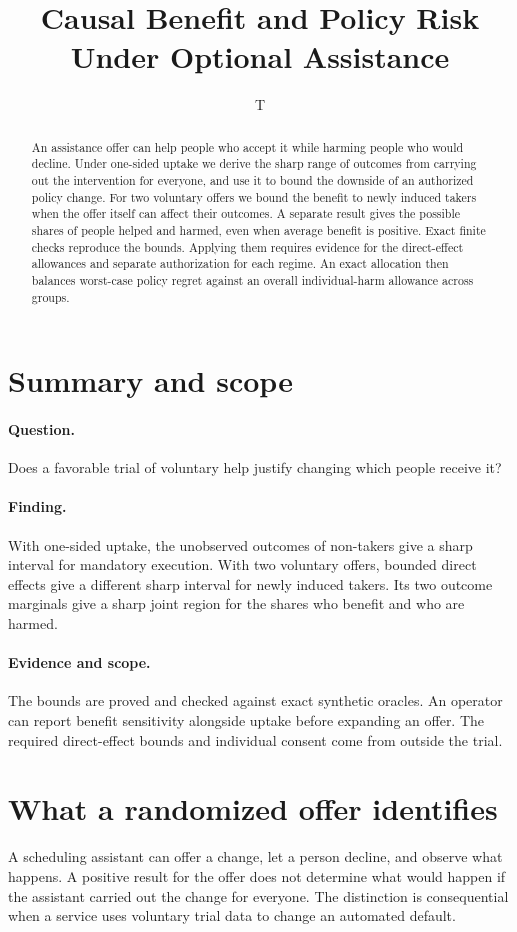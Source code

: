 \documentclass[11pt]{article}
\title{Causal Benefit and Policy Risk Under Optional Assistance}
\author{T}
\date{}
\begin{document}
\maketitle
\begin{abstract}
An assistance offer can help people who accept it while harming
people who would decline. Under one-sided uptake we derive the
sharp range of outcomes from carrying out the intervention for
everyone, and use it to bound the downside of an authorized policy
change. For two voluntary offers we bound the benefit to newly
induced takers when the offer itself can affect their outcomes.
A separate result gives the possible shares of people helped and
harmed, even when average benefit is positive. Exact finite checks
reproduce the bounds. Applying them requires evidence for the
direct-effect allowances and separate authorization for each regime.
An exact allocation then balances worst-case policy regret against
an overall individual-harm allowance across groups.
\end{abstract}

\section*{Summary and scope}
\paragraph{Question.} Does a favorable trial of voluntary help justify
changing which people receive it?
\paragraph{Finding.} With one-sided uptake, the unobserved outcomes of
non-takers give a sharp interval for mandatory execution. With two
voluntary offers, bounded direct effects give a different sharp interval
for newly induced takers. Its two outcome marginals give a sharp
joint region for the shares who benefit and who are harmed.
\paragraph{Evidence and scope.} The bounds are proved and checked
against exact synthetic oracles. An operator can report benefit
sensitivity alongside uptake before expanding an offer. The required
direct-effect bounds and individual consent come from outside the trial.

\section{What a randomized offer identifies}
A scheduling assistant can offer a change, let a person decline,
and observe what happens. A positive result for the offer does not
determine what would happen if the assistant carried out the change
for everyone. The distinction is consequential when a service uses
voluntary trial data to change an automated default.
\end{document}
